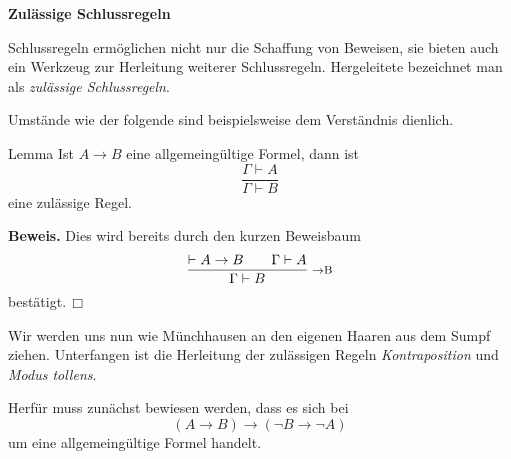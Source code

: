 \documentclass[8pt]{beamer}
\newcommand{\strong}[1]{\textsf{\textbf{#1}}}
\newcommand{\infernote}[1]{\!\text{\footnotesize #1}}
\renewcommand{\qedsymbol}{\ensuremath{\Box}}
\newcommand{\centerheadline}[1]{%
  \begin{center}\strong{#1}\end{center}}
\newcommand{\parspace}{\vspace{0.8em}}
\newcommand{\cond}{\rightarrow}
\begin{document}
\begin{frame}
\centerheadline{Zulässige Schlussregeln}
\end{frame}

\begin{frame}
Schlussregeln ermöglichen nicht nur die Schaffung von Beweisen,
sie bieten auch ein Werkzeug zur Herleitung weiterer Schlussregeln.
Hergeleitete bezeichnet man als \emph{zulässige Schlussregeln}.\pause{}

\parspace
Umstände wie der folgende sind beispielsweise
dem Verständnis dienlich.

\begin{block}{Lemma}
Ist $A\cond B$ eine allgemeingültige
Formel, dann ist
\[\dfrac{\Gamma\vdash A}{\Gamma\vdash B}\]
eine zulässige Regel.
\end{block}\pause

\parspace
\strong{Beweis.} Dies wird bereits durch den kurzen Beweisbaum
\[\dfrac{\vdash A\cond B\qquad \Gamma\vdash A}{
  \Gamma\vdash B}\;\,\infernote{$\cond$B}\]
bestätigt.\,\qedsymbol
\end{frame}

\begin{frame}
Wir werden uns nun wie Münchhausen an den eigenen Haaren aus dem
Sumpf ziehen. Unterfangen ist die Herleitung der zulässigen Regeln
\emph{Kontraposition} und \emph{Modus tollens}.\pause

\parspace
Herfür muss zunächst bewiesen werden, dass es sich bei
\[(A\cond B)\cond (\neg B\cond\neg A)\]
um eine allgemeingültige Formel handelt.
\end{frame}
\end{document}
